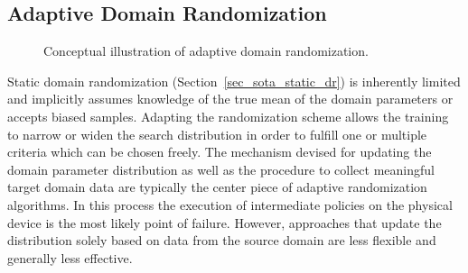 \documentclass[utf8]{frontiersSCNS} %
\begin{document}
\subsection{Adaptive Domain Randomization}
\label{sec_sota_adaptive_dr}
\begin{figure} %
	\raggedleft
	\vspace*{-1.3\baselineskip}
	
	\caption{Conceptual illustration of adaptive domain randomization.}
	\label{fig_sota_adaptive_dr}
\end{figure}
Static domain randomization (Section~\ref{sec_sota_static_dr}) is inherently limited and implicitly assumes knowledge of the true mean of the domain parameters or accepts biased samples.
Adapting the randomization scheme allows the training to narrow or widen the search distribution in order to fulfill one or multiple criteria which can be chosen freely.
The mechanism devised for updating the domain parameter distribution as well as the procedure to collect meaningful target domain data are typically the center piece of adaptive randomization algorithms.
In this process the execution of intermediate policies on the physical device is the most likely point of failure.
However, approaches that update the distribution solely based on data from the source domain are less flexible and generally less effective.

\end{document}
